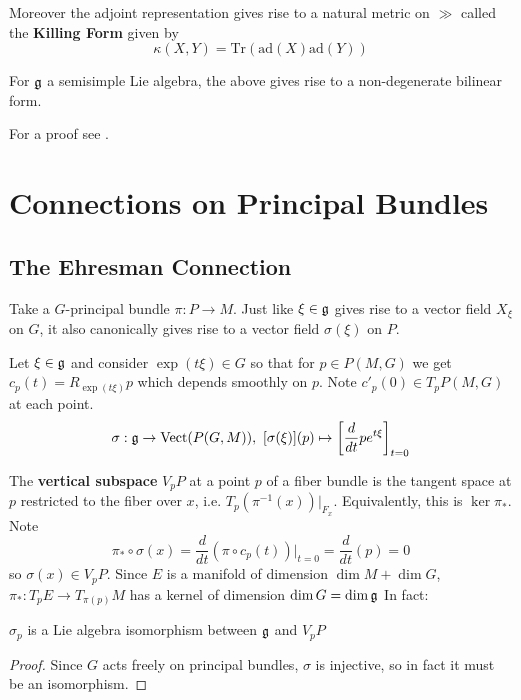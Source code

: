 		Moreover the adjoint representation gives rise to a natural metric on $\gg$ called the \textbf{Killing Form} given by
		\begin{equation}
			\kappa (X, Y) = \mathrm{Tr}(\mathrm{ad}(X) \mathrm{ad}(Y))
		\end{equation}
		
		\begin{prop}
			For $\frak g$ a semisimple Lie algebra, the above gives rise to a non-degenerate bilinear form. 
		\end{prop}
		For a proof see \cite{humphreys2012}.
		
		\section{Connections on Principal Bundles}
		
		\subsection{The Ehresman Connection}
		
		Take a $G$-principal bundle $\pi: P \rightarrow M$. 
		Just like $\xi \in \frak g$ gives rise to a vector field $X_\xi$ on $G$, it also canonically gives rise to a vector field $\sigma(\xi)$ on $P$.
		\begin{defn}
			Let $\xi \in \frak g$ and consider $\exp(t \xi) \in G$ so that for $p \in P(M,G)$ we get $c_p(t) = R_{\exp(t \xi)} p$ which depends smoothly on $p$. Note $c'_p(0) \in T_p P(M,G)$ at each point.
			\begin{equation}
				\sigma: \frak g \rightarrow \text{Vect}(P(G,M)), ~ [\sigma(\xi)](p) \mapsto \left[ \frac{d}{dt} p e^{t \xi}\right]_{t=0}
			\end{equation}
		\end{defn}
		The \textbf{vertical subspace} $V_p P$ at a point $p$ of a fiber bundle is the tangent space at $p$ restricted to the fiber over $x$, i.e. $T_p (\pi^{-1}(x))|_{F_x}$. Equivalently, this is $\ker \pi_*$. Note
		\begin{equation}
			\pi_* \circ \sigma(x) = \frac{d}{dt} (\pi \circ c_p(t))|_{t=0} = \frac{d}{dt} (p) = 0
		\end{equation} 
		so $\sigma(x) \in V_p P$. 
		Since $E$ is a manifold of dimension $\dim M + \dim G$, $\pi_*: T_pE \rightarrow T_{\pi(p)}M$ has a kernel of dimension $\dim G = \dim \frak g$
		In fact:
		\begin{prop}
			$\sigma_p$ is a Lie algebra isomorphism between $\frak g$ and $V_pP$
		\end{prop}
		 \begin{proof}
		 	Since $G$ acts freely on principal bundles, $\sigma$ is injective, so in fact it must be an isomorphism.
		 \end{proof}
	
